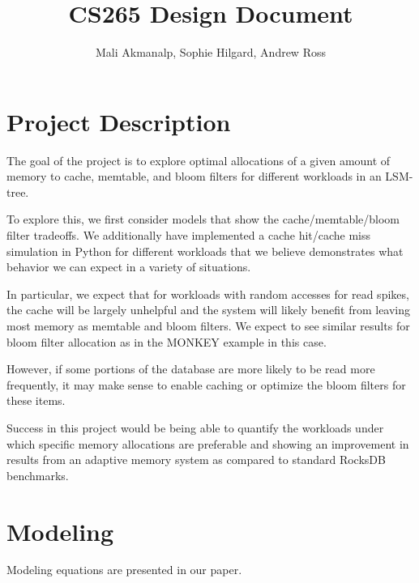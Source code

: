 \documentclass[11pt]{article}
\theoremstyle{plain}
\theoremstyle{definition}
\begin{document}
\title{CS265 Design Document}
\author{Mali Akmanalp, Sophie Hilgard, Andrew Ross}
\maketitle

\section{Project Description}

The goal of the project is to explore optimal allocations of a given amount of memory to cache, memtable, and bloom filters for different workloads in an LSM-tree.

To explore this, we first consider models that show the cache/memtable/bloom filter tradeoffs. We additionally have implemented a cache hit/cache miss simulation in Python for different workloads that we believe demonstrates what behavior we can expect in a variety of situations.

In particular, we expect that for workloads with random accesses for read spikes, the cache will be largely unhelpful and the system will likely benefit from leaving most memory as memtable and bloom filters. We expect to see similar results for bloom filter allocation as in the MONKEY example in this case.

However, if some portions of the database are more likely to be read more frequently, it may make sense to enable caching or optimize the bloom filters for these items.

Success in this project would be being able to quantify the workloads under which specific memory allocations are preferable and showing an improvement in results from an adaptive memory system as compared to standard RocksDB benchmarks.
\section{Modeling}
Modeling equations are presented in our paper.
\end{document}
